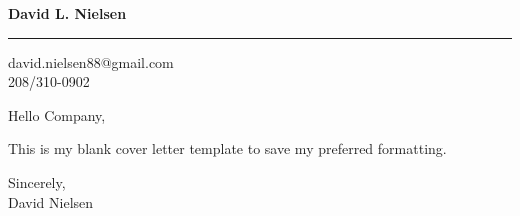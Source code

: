 \documentclass{letter} %
\begin{document}
\longindentation=0pt                       %
\let\raggedleft\raggedright                %
 \date{}
 
\begin{letter}{
}


\begin{flushleft}
{\large\bf David L. Nielsen}
\end{flushleft}
\medskip\hrule height 1pt
\begin{flushright}
\hfill david.nielsen88@gmail.com \\
\hfill 208/310-0902
\end{flushright} 
\opening{Hello Company,}

\noindent This is my blank cover letter template to save my preferred formatting.
					
\noindent 
					
 
\closing{Sincerely,
\\David Nielsen} 





\end{letter}
 
\end{document}
